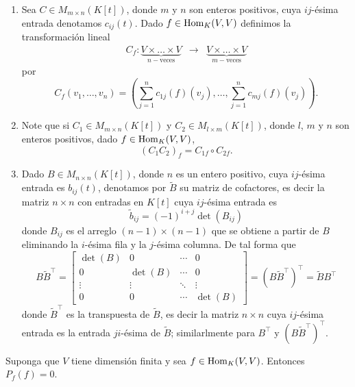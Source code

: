 \begin{obs}
\begin{enumerate}
\item Sea $C\in M_{m\times n}(K[t])$, donde $m$ y $n$ son enteros positivos, cuya $ij$-\'esima entrada denotamos $c_{ij}(t)$. Dado $f\in\operatorname{Hom}_K(V,V)$ definimos la transformaci\'on lineal
\begin{eqnarray}
C_f:\underbrace{V\times\ldots\times V}_{n-\textrm{veces}} &\longrightarrow & \underbrace{V\times\ldots\times V}_{m-\textrm{veces}}
\end{eqnarray}
por
\[
C_f(v_1,\ldots,v_n)=\left(\sum_{j=1}^nc_{1j}(f)(v_j),\ldots,\sum_{j=1}^nc_{mj}(f)(v_j)\right).
\]
\item Note que si $C_1\in M_{m\times n}(K[t])$ y $C_2\in M_{l\times m}(K[t])$, donde $l$, $m$ y $n$ son enteros positivos, dado $f\in\operatorname{Hom}_K(V,V)$, 
\[
\left(C_1C_2\right)_f=C_{1 f}\circ C_{2 f}. 
\]
\item Dado $B\in M_{n\times n}(K[t])$, donde $n$ es un entero positivo, cuya $ij$-\'esima entrada es $b_{ij}(t)$, denotamos por $\tilde{B}$ su matriz de cofactores, es decir la matriz $n\times n$ con entradas en $K[t]$ cuya $ij$-\'esima entrada es
\[
\tilde{b}_{ij}=(-1)^{i+j}\det(B_{ij})
\]
donde $B_{ij}$ es el arreglo $(n-1)\times(n-1)$ que se obtiene a partir de $B$ eliminando la $i$-\'esima fila y la $j$-\'esima columna. De tal forma que
\[
B\tilde{B}^\intercal=\left[\begin{array}{cccc}
\det(B) & 0 & \cdots & 0\\
0 & \det(B) & \cdots & 0\\
\vdots & \vdots & \ddots &\vdots\\
0 & 0 &\cdots & \det(B)
\end{array}\right]=(B\tilde{B}^\intercal)^\intercal=\tilde{B}B^\intercal
\]
donde $\tilde{B}^\intercal$ es la transpuesta de $\tilde{B}$, es decir la matriz $n\times n$ cuya $ij$-\'esima entrada es la entrada $ji$-\'esima de $\tilde{B}$; similarlmente para $B^\intercal$ y $(B\tilde{B}^\intercal)^\intercal$.
\end{enumerate}
\end{obs}

\begin{teo}
Suponga que $V$ tiene dimensi\'on finita y sea $f\in\operatorname{Hom}_K(V,V)$. Entonces $P_f(f)=0$.
\end{teo}

